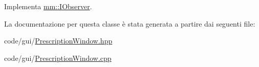 Implementa \mbox{\hyperlink{classmm_1_1_i_observer_a6422af04f8e9f3ba9d6d412a3bcdd03e}{mm\+::\+I\+Observer}}.



La documentazione per questa classe è stata generata a partire dai seguenti file\+:\begin{DoxyCompactItemize}
\item 
code/gui/\mbox{\hyperlink{_prescription_window_8hpp}{Prescription\+Window.\+hpp}}\item 
code/gui/\mbox{\hyperlink{_prescription_window_8cpp}{Prescription\+Window.\+cpp}}\end{DoxyCompactItemize}
